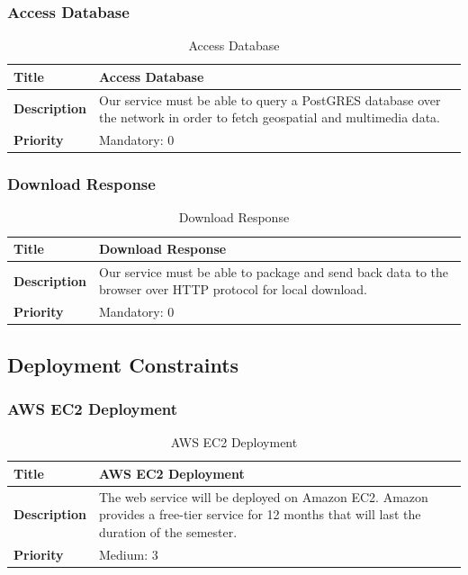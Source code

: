 \documentclass{article}
\begin{document}
\subsubsection{Access Database}

\begin{table}[H]
	\caption{Access Database}
	\begin{tabularx}{\textwidth}{|l|X|}
		\hline
		\textbf{Title}       & Access Database                              \\ \hline
		\textbf{Description} & Our service must be able to query a PostGRES
		database over the network in order to fetch geospatial and multimedia
		data.     \\ \hline
		\textbf{Priority}    & Mandatory: 0                                 \\ \hline
	\end{tabularx}
\end{table}

\subsubsection{Download Response}

\begin{table}[H]
	\caption{Download Response}
	\begin{tabularx}{\textwidth}{|l|X|}
		\hline
		\textbf{Title}       & Download Response                                 \\ \hline
		\textbf{Description} & Our service must be able to package and send back
		data to the browser over HTTP protocol for local download. \\ \hline
		\textbf{Priority}    & Mandatory: 0                                      \\ \hline
	\end{tabularx}
\end{table}

\subsection{Deployment Constraints}

\subsubsection{AWS EC2 Deployment}

\begin{table}[H]
	\caption{AWS EC2 Deployment}
	\begin{tabularx}{\textwidth}{|l|X|}
		\hline
		\textbf{Title}       & AWS EC2 Deployment                              \\ \hline
		\textbf{Description} & The web service will be deployed on Amazon EC2.
		Amazon provides a free-tier service for 12 months that will last the
		duration of the semester.        \\ \hline
		\textbf{Priority}    & Medium: 3                                       \\ \hline
	\end{tabularx}
\end{table}
\end{document}
